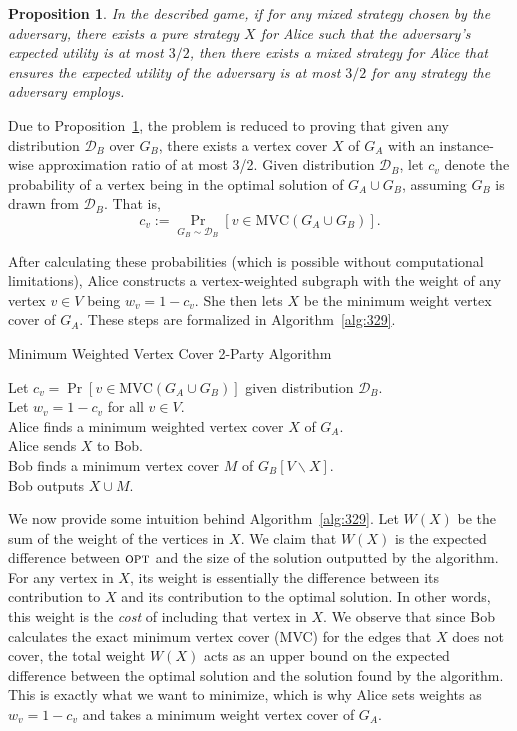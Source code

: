 \documentclass[11pt]{article}
\newtheorem{proposition}[theorem]{Proposition}
\newcommand{\opt}{\ensuremath{\textsc{opt}}}
\newcommand{\MVC}{\text{MVC}}
\begin{document}
\begin{proposition}\label{prop:kjpiwqe9ji}
In the described game, if for any mixed strategy chosen by the
adversary, there exists a pure strategy \( X \) for Alice such that
the adversary's expected utility is at most \( 3/2 \), then there
exists a mixed strategy for Alice that ensures the expected utility of
the adversary is at most \( 3/2 \) for any strategy the adversary
employs.
\end{proposition}

Due to Proposition~\ref{prop:kjpiwqe9ji},
the problem is reduced to proving that given any distribution \(
\mathcal{D}_B \) over \( G_B \), there exists a vertex cover \( X \)
of \( G_A \) with an instance-wise approximation ratio of at most
3/2. Given distribution $\mathcal{D}_B$, let \( c_v \) denote the
probability of a vertex being in the optimal solution of $G_A \cup
G_B$, assuming $G_B$ is drawn from $\mathcal{D}_B$.  That is,
\[ c_v := \Pr_{G_B \sim \mathcal{D}_B}[v \in \MVC(G_A \cup G_B)]. \]

After calculating these probabilities (which is possible without computational limitations), Alice constructs a
vertex-weighted subgraph with the weight of any vertex \( v \in V \)
being \( w_v= 1-c_v \). She then lets \( X \) be the minimum weight
vertex cover of \( G_A \).  These steps are formalized in
Algorithm~\ref{alg:329}.


\LinesNumbered
\begin{algorithm}[ht]
  \caption{Minimum Weighted Vertex Cover 2-Party Algorithm\label{alg:329}}
  Let \( c_v = \Pr[v \in \MVC(G_A \cup G_B)] \) given distribution \( \mathcal{D}_B \).\\
  Let \( w_v = 1 - c_v \) for all \( v \in V \).\\
  Alice finds a minimum weighted vertex cover \( X \) of \( G_A \).\\
  Alice sends \( X \) to Bob.\\
  Bob finds a minimum vertex cover \( M \) of \( G_B[V \backslash X] \).\\
  Bob outputs \( X \cup M \).
\end{algorithm}

We now provide some intuition behind Algorithm~\ref{alg:329}. Let \(
W(X) \) be the sum of the weight of the vertices in \( X \). We claim
that \( W(X) \) is the expected difference between \(\opt\) and the
size of the solution outputted by the algorithm. For any vertex in \(
X\), its weight is essentially the difference between its
contribution to \( X \) and its contribution to the optimal
solution. In other words, this weight is the {\em cost} of including
that vertex in \( X \).
We observe that since Bob calculates the
exact minimum vertex cover (MVC) for the edges that \( X \) does not
cover, the total weight \( W(X) \) acts as an upper bound on the
expected difference between the optimal solution and the solution
found by the algorithm.  This is exactly what we want to minimize,
which is why Alice sets weights as \( w_v= 1-c_v \) and takes a
minimum weight vertex cover of \( G_A \).
\end{document}
